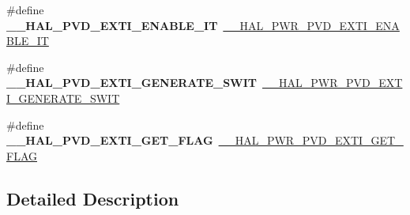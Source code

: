 \begin{DoxyCompactItemize}
\item 
\hypertarget{group___h_a_l___p_w_r___aliased___macros_ga3259ab94dbb26432e4139917a4e04411}{\#define {\bfseries \-\_\-\-\_\-\-H\-A\-L\-\_\-\-P\-V\-D\-\_\-\-E\-X\-T\-I\-\_\-\-E\-N\-A\-B\-L\-E\-\_\-\-I\-T}~\hyperlink{group___p_w_r___exported___macros_ga3180f039cf14ef78a64089f387f8f9c2}{\-\_\-\-\_\-\-H\-A\-L\-\_\-\-P\-W\-R\-\_\-\-P\-V\-D\-\_\-\-E\-X\-T\-I\-\_\-\-E\-N\-A\-B\-L\-E\-\_\-\-I\-T}}\label{group___h_a_l___p_w_r___aliased___macros_ga3259ab94dbb26432e4139917a4e04411}

\item 
\hypertarget{group___h_a_l___p_w_r___aliased___macros_gaf9d584e87f1888f0c39976613208a81e}{\#define {\bfseries \-\_\-\-\_\-\-H\-A\-L\-\_\-\-P\-V\-D\-\_\-\-E\-X\-T\-I\-\_\-\-G\-E\-N\-E\-R\-A\-T\-E\-\_\-\-S\-W\-I\-T}~\hyperlink{group___p_w_r___exported___macros_gaba4a7968f5c4c4ca6a7047b147ba18d4}{\-\_\-\-\_\-\-H\-A\-L\-\_\-\-P\-W\-R\-\_\-\-P\-V\-D\-\_\-\-E\-X\-T\-I\-\_\-\-G\-E\-N\-E\-R\-A\-T\-E\-\_\-\-S\-W\-I\-T}}\label{group___h_a_l___p_w_r___aliased___macros_gaf9d584e87f1888f0c39976613208a81e}

\item 
\hypertarget{group___h_a_l___p_w_r___aliased___macros_ga1d5be8243a9659943e0b861d2d5ce923}{\#define {\bfseries \-\_\-\-\_\-\-H\-A\-L\-\_\-\-P\-V\-D\-\_\-\-E\-X\-T\-I\-\_\-\-G\-E\-T\-\_\-\-F\-L\-A\-G}~\hyperlink{group___p_w_r___exported___macros_ga5e66fa75359b51066e0731ac1e5ae438}{\-\_\-\-\_\-\-H\-A\-L\-\_\-\-P\-W\-R\-\_\-\-P\-V\-D\-\_\-\-E\-X\-T\-I\-\_\-\-G\-E\-T\-\_\-\-F\-L\-A\-G}}\label{group___h_a_l___p_w_r___aliased___macros_ga1d5be8243a9659943e0b861d2d5ce923}

\end{DoxyCompactItemize}


\subsection{Detailed Description}
